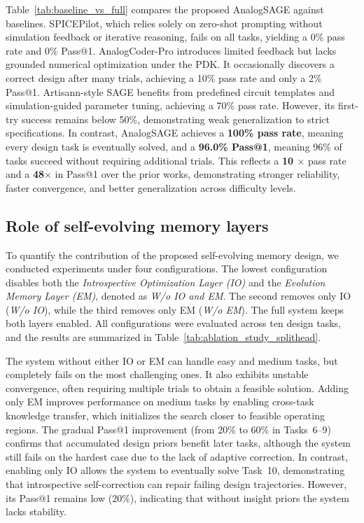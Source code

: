 Table~\ref{tab:baseline_vs_full} compares the proposed AnalogSAGE against baselines. SPICEPilot, which relies solely on zero-shot prompting without simulation feedback or iterative reasoning, fails on all tasks, yielding a 0\% pass rate and 0\% Pass@1. AnalogCoder-Pro introduces limited feedback but lacks grounded numerical optimization under the PDK. It occasionally discovers a correct design after many trials, achieving a 10\% pass rate and only a 2\% Pass@1. Artisann-style SAGE benefits from predefined circuit templates and simulation-guided parameter tuning, achieving a 70\% pass rate. However, its first-try success remains below 50\%, demonstrating weak generalization to strict specifications. In contrast, AnalogSAGE achieves a \textbf{100\% pass rate}, meaning every design task is eventually solved, and a \textbf{96.0\% Pass@1}, meaning 96\% of tasks succeed without requiring additional trials. This reflects a \textbf{10 $\times$} pass rate and a \textbf{48$\times$} in Pass@1 over the prior works, demonstrating stronger reliability, faster convergence, and better generalization across difficulty levels.

\subsection{Role of self-evolving memory layers}


To quantify the contribution of the proposed self-evolving memory design, we conducted experiments under four configurations.  
The lowest configuration disables both the \emph{Introspective Optimization Layer (IO)} and the \emph{Evolution Memory Layer (EM)}, denoted as \emph{W/o IO and EM}.  
The second removes only IO (\emph{W/o IO}), while the third removes only EM (\emph{W/o EM}).  
The full system keeps both layers enabled. All configurations were evaluated across ten design tasks, and the results are summarized in Table~\ref{tab:ablation_study_splithead}.


The system without either IO or EM can handle easy and medium tasks, but completely fails on the most challenging ones. It also exhibits unstable convergence, often requiring multiple trials to obtain a feasible solution.
Adding only EM improves performance on medium tasks by enabling cross-task knowledge transfer, which initializes the search closer to feasible operating regions. The gradual Pass@1 improvement (from 20\% to 60\% in Tasks~6--9) confirms that accumulated design priors benefit later tasks, although the system still fails on the hardest case due to the lack of adaptive correction.
In contrast, enabling only IO allows the system to eventually solve Task~10, demonstrating that introspective self-correction can repair failing design trajectories. However, its Pass@1 remains low (20\%), indicating that without insight priors the system lacks stability.

